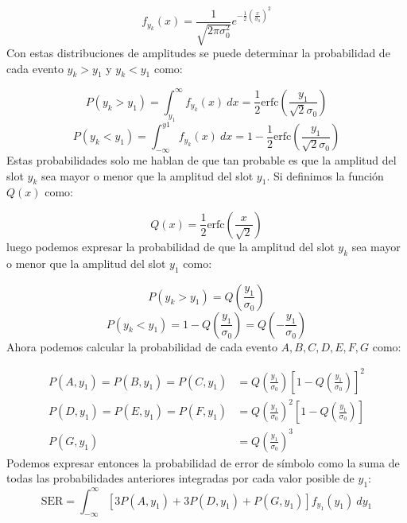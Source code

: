 \documentclass{article}
\begin{document}
            \begin{equation}
                f_{y_k}(x) = \frac{1}{\sqrt{2\pi\sigma_0^2}}e^{-\frac{1}{2}\left( \frac{x}{\sigma_0} \right)^2}
            \end{equation}
            Con estas distribuciones de amplitudes se puede determinar la probabilidad de cada evento $y_k>y_1$ y $y_k<y_1$ como:
            
            \begin{equation}
                P(y_k>y_1) = \int_{y_1}^{\infty} f_{y_k}(x)\:dx= \frac{1}{2}\text{erfc}\left( \frac{y_1}{\sqrt{2}\sigma_0} \right)
            \end{equation}
            \begin{equation}
                P(y_k<y_1) = \int_{-\infty}^{y1} f_{y_k}(x)\:dx= 1-\frac{1}{2}\text{erfc}\left( \frac{y_1}{\sqrt{2}\sigma_0} \right)
            \end{equation}
            Estas probabilidades solo me hablan de que tan probable es que la amplitud del slot $y_k$ sea 
            mayor o menor que la amplitud del slot $y_1$. Si definimos la función $Q(x)$ como:
            
            \begin{equation}
                Q(x) = \frac{1}{2}\text{erfc}\left( \frac{x}{\sqrt{2}} \right)
            \end{equation}
            luego podemos expresar la probabilidad de que la amplitud del slot $y_k$ sea mayor o menor que la amplitud del slot $y_1$ como:
            
            \begin{equation}
                P(y_k>y_1) = Q\left( \frac{y_1}{\sigma_0} \right)
            \end{equation}
            \begin{equation}
                P(y_k<y_1) = 1-Q\left( \frac{y_1}{\sigma_0} \right) = Q\left( -\frac{y_1}{\sigma_0} \right)
            \end{equation}
            Ahora podemos calcular la probabilidad de cada evento $A,B,C,D,E,F,G$ como:
            
            \begin{align}
                P(A,y_1)=P(B,y_1)=P(C,y_1) & = Q\left( \frac{y_1}{\sigma_0} \right) \left[ 1-Q\left( \frac{y_1}{\sigma_0} \right) \right]^2 \\
                P(D,y_1)=P(E,y_1)=P(F,y_1) & = Q\left( \frac{y_1}{\sigma_0} \right)^2 \left[ 1-Q\left( \frac{y_1}{\sigma_0} \right) \right] \\
                P(G,y_1) & = Q\left( \frac{y_1}{\sigma_0} \right)^3
            \end{align}
            Podemos expresar entonces la probabilidad de error de símbolo como la suma de todas las probabilidades anteriores
            integradas por cada valor posible de $y_1$:
            \begin{equation}
                \text{SER} = \int_{-\infty}^{\infty} \left[ 3 P(A,y_1) + 3 P(D,y_1) + P(G,y_1) \right] f_{y_1}(y_1)\:dy_1
            \end{equation}
\end{document}
